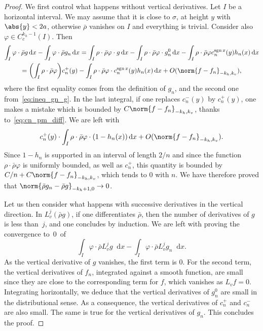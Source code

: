 \documentclass[10pt]{amsart}
\newcommand{\dd}{\mathop{}\!\mathrm{d}}
\newcommand{\paregg}[1]{\biggl(#1\biggr)}
\DeclareMathOperator{\sgn}{sgn}
\let\phi\varphi
\theoremstyle{definition}
\numberwithin{equation}{section}
\begin{document}
\begin{proof}
We first control what happens without vertical derivatives. Let $I$ be a
horizontal interval. We may assume that it is close to $\sigma$, at height
$y$ with $\abs{y}<2a$, otherwise $\bar\rho$ vanishes on $I$ and everything is
trivial. Consider also $\phi \in C^{k_h-1}_c(I)$. Then
\begin{multline*}
\int_I \phi \cdot \bar\rho g \dd x - \int_I \phi \cdot \bar\rho g_n \dd x
= \int_I \rho \cdot \bar\rho \phi \cdot g \dd x - \int_I \rho \cdot \bar\rho \phi \cdot g_n^0 \dd x
- \int_I \rho \cdot \bar\rho \phi c_n^{\sgn x}(y) h_n(x) \dd x
\\ =\paregg{\int_I \rho \cdot \bar\rho \phi} c_n^+(y) - \int_I \rho \cdot \bar\rho \phi \cdot c_n^{\sgn x}(y) h_n(x) \dd x
+ O(\norm{f-f_n}_{-k_h, k_v}),
\end{multline*}
where the first equality comes from the definition of $g_n$, and the second
one from~\eqref{eq:ineq_gn_g}. In the last integral, if one replaces
$c_n^-(y)$ by $c_n^+(y)$, one makes a mistake which is bounded by
$C\norm{f-f_n}_{-k_h, k_v}$, thanks to~\eqref{eq:cn_pm_diff}. We are left
with
\begin{equation*}
c_n^+(y) \cdot \int_I \rho \cdot \bar\rho \phi \cdot (1-h_n(x)) \dd x + O(\norm{f-f_n}_{-k_h, k_v}).
\end{equation*}
Since $1-h_n$ is supported in an interval of length $2/n$ and since the
function $\rho \cdot \bar\rho \phi$ is uniformly bounded, as well as $c_n^+$,
this quantity is bounded by $C/n + C \norm{f-f_n}_{-k_h, k_v}$, which tends
to $0$ with $n$. We have therefore proved that $\norm{\bar\rho g_n - \bar
\rho g}_{-k_h+1, 0} \to 0$.

Let us then consider what happens with successive derivatives in the vertical
direction. In $L_v^j(\bar \rho g)$, if one differentiates $\bar \rho$, then
the number of derivatives of $g$ is less than~$j$, and one concludes by
induction. We are left with proving the convergence to~$0$~of
\begin{equation*}
\int_I \phi \cdot \bar\rho L_v^j g \dd x - \int_I \phi \cdot \bar\rho L_v^j g_n \dd x.
\end{equation*}
As the vertical derivative of $g$ vanishes, the first term is $0$. For the
second term, the vertical derivatives of $f_n$, integrated against a smooth
function, are small since they are close to the corresponding term for $f$,
which vanishes as $L_v f = 0$. Integrating horizontally, we deduce that the
vertical derivatives of $g_n^0$ are small in the distributional sense. As a
consequence, the vertical derivatives of $c_n^+$ and $c_n^-$ are also small.
The same is true for the vertical derivatives of $g_n$. This concludes the
proof.
\end{proof}
\end{document}
